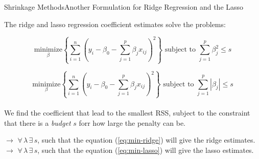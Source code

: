 \begin{frame}{Shrinkage Methods}{Another Formulation for Ridge Regression and the Lasso}

The ridge and lasso regression coeﬃcient estimates solve the problems: \pause

        \begin{equation}\label{eq:min-ridge}
        \underset{\beta}{\text{minimize}} \left\{     \sum_{i=1}^n \left(y_i - \beta_0 - \sum_{j=1}^p  \beta_j x_{ij} \right)^2  \right\} \text{ subject to }   \sum_{j=1}^p \beta_j^2 \leq s
    \end{equation} \pause 

    \begin{equation}\label{eq:min-lasso}
        \underset{\beta}{\text{minimize}} \left\{     \sum_{i=1}^n \left(y_i - \beta_0 - \sum_{j=1}^p  \beta_j x_{ij} \right)^2  \right\} \text{ subject to }  \sum_{j=1}^p |\beta_j| \leq s
    \end{equation} \pause \\

We find the coeﬃcient that lead to the smallest RSS, subject to the constraint that there is a \textit{budget} $s$ forr how large the penalty can be. \pause 

    $\rightarrow$ $\forall \, \lambda \, \exists \, s$, such that the equation (\ref{eq:min-ridge}) will give the ridge estimates. \pause \\ 
    $\rightarrow$ $\forall \, \lambda \, \exists \, s$, such that the equation (\ref{eq:min-lasso}) will give the lasso estimates. 

\end{frame}

